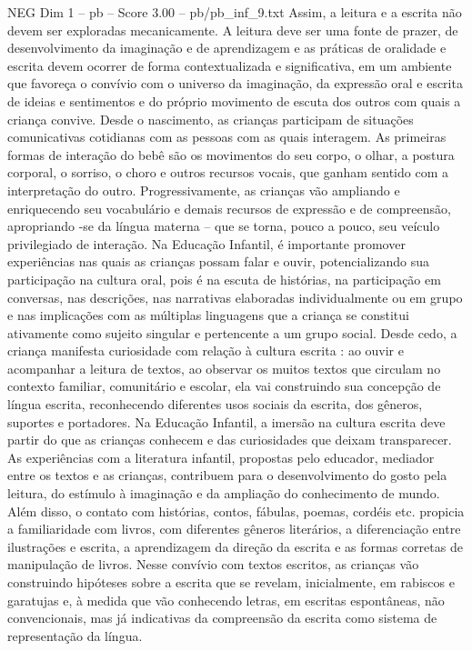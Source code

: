 \begin{textsample}{NEG Dim 1 – pb – Score 3.00 – pb/pb\_inf\_9.txt}
Assim, a leitura e a escrita não devem ser exploradas mecanicamente.
A leitura deve ser uma fonte de prazer, de desenvolvimento da imaginação e de aprendizagem e as práticas de oralidade e escrita devem ocorrer de forma contextualizada e significativa, em um ambiente que favoreça o convívio com o universo da imaginação, da expressão oral e escrita de ideias e sentimentos e do próprio movimento de escuta dos outros com quais a criança convive.
Desde o nascimento, as crianças participam de situações comunicativas cotidianas com as pessoas com as quais interagem.
As primeiras formas de interação do bebê são os movimentos do seu corpo, o olhar, a postura corporal, o sorriso, o choro e outros recursos vocais, que ganham sentido com a interpretação do outro.
Progressivamente, as crianças vão ampliando e enriquecendo seu vocabulário e demais recursos de expressão e de compreensão, apropriando -se da língua materna – que se torna, pouco a pouco, seu veículo privilegiado de interação.
Na Educação Infantil, é importante promover experiências nas quais as crianças possam falar e ouvir, potencializando sua participação na cultura oral, pois é na escuta de histórias, na participação em conversas, nas descrições, nas narrativas elaboradas individualmente ou em grupo e nas implicações com as múltiplas linguagens que a criança se constitui ativamente como sujeito singular e pertencente a um grupo social.
Desde cedo, a criança manifesta curiosidade com relação à cultura escrita : ao ouvir e acompanhar a leitura de textos, ao observar os muitos textos que circulam no contexto familiar, comunitário e escolar, ela vai construindo sua concepção de língua escrita, reconhecendo diferentes usos sociais da escrita, dos gêneros, suportes e portadores.
Na Educação Infantil, a imersão na cultura escrita deve partir do que as crianças conhecem e das curiosidades que deixam transparecer.
As experiências com a literatura infantil, propostas pelo educador, mediador entre os textos e as crianças, contribuem para o desenvolvimento do gosto pela leitura, do estímulo à imaginação e da ampliação do conhecimento de mundo.
Além disso, o contato com histórias, contos, fábulas, poemas, cordéis etc. propicia a familiaridade com livros, com diferentes gêneros literários, a diferenciação entre ilustrações e escrita, a aprendizagem da direção da escrita e as formas corretas de manipulação de livros.
Nesse convívio com textos escritos, as crianças vão construindo hipóteses sobre a escrita que se revelam, inicialmente, em rabiscos e garatujas e, à medida que vão conhecendo letras, em escritas espontâneas, não convencionais, mas já indicativas da compreensão da escrita como sistema de representação da língua.

\end{textsample}
